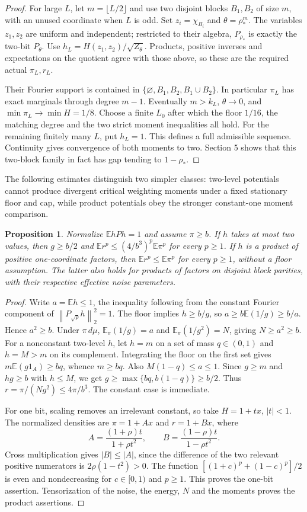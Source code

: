 \documentclass[11pt]{article}
\newcommand{\E}{\mathbb E}
\newcommand{\norm}[1]{\left\|#1\right\|}
\newtheorem{proposition}[theorem]{Proposition}
\begin{document}
\begin{proof}
For large $L$, let $m=\lfloor L/2\rfloor$ and use two disjoint blocks $B_1,B_2$ of size $m$, with an unused coordinate when $L$ is odd. Set $z_i=\chi_{B_i}$ and $\theta=\rho_*^m$. The variables $z_1,z_2$ are uniform and independent; restricted to their algebra, $P_{\rho_*}$ is exactly the two-bit $P_\theta$. Use $h_L=H(z_1,z_2)/\sqrt{Z_\theta}$. Products, positive inverses and expectations on the quotient agree with those above, so these are the required actual $\pi_L,r_L$.

Their Fourier support is contained in
$\{\varnothing,B_1,B_2,B_1\cup B_2\}$. In particular $\pi_L$ has exact marginals through degree $m-1$. Eventually $m>k_L$, $\theta\to0$, and $\min\pi_L\to\min H=1/8$. Choose a finite $L_0$ after which the floor $1/16$, the matching degree and the two strict moment inequalities all hold. For the remaining finitely many $L$, put $h_L=1$. This defines a full admissible sequence. Continuity gives convergence of both moments to two. Section 5 shows that this two-block family in fact has gap tending to $1-\rho_*$.
\end{proof}

The following estimates distinguish two simpler classes: two-level potentials cannot produce divergent critical weighting moments under a fixed stationary floor and cap, while product potentials obey the stronger constant-one moment comparison.
\begin{proposition}\label{simplefamilies}
Normalize $\E hPh=1$ and assume $\pi\geq b$. If $h$ takes at most two values, then $g\geq b/2$ and
$\E r^p\leq(4/b^3)^p\E\pi^p$ for every $p\geq1$.
If $h$ is a product of positive one-coordinate factors, then $\E r^p\leq\E\pi^p$ for every $p\geq1$, without a floor assumption. The latter also holds for products of factors on disjoint block parities, with their respective effective noise parameters.
\end{proposition}
\begin{proof}
Write $a=\E h\leq1$, the inequality following from the constant Fourier component of $\norm{P_{\sqrt\rho}h}_2^2=1$. The floor implies $h\geq b/g$, so $a\geq b\E(1/g)\geq b/a$. Hence $a^2\geq b$. Under $\pi\,d\mu$,
$\E_\pi(1/g)=a$ and $\E_\pi(1/g^2)=N$, giving $N\geq a^2\geq b$.
For a nonconstant two-level $h$, let $h=m$ on a set of mass $q\in(0,1)$ and $h=M>m$ on its complement. Integrating the floor on the first set gives $m\E(g1_A)\geq bq$, whence $m\geq bq$. Also $M(1-q)\leq a\leq1$. Since $g\geq m$ and $hg\geq b$ with $h\leq M$, we get $g\geq\max\{bq,b(1-q)\}\geq b/2$. Thus $r=\pi/(Ng^2)\leq4\pi/b^3$. The constant case is immediate.

For one bit, scaling removes an irrelevant constant, so take $H=1+tx$, $|t|<1$. The normalized densities are $\pi=1+Ax$ and $r=1+Bx$, where
\[
 A=\frac{(1+\rho)t}{1+\rho t^2},\qquad
 B=\frac{(1-\rho)t}{1-\rho t^2}.
\]
Cross multiplication gives $|B|\leq|A|$, since the difference of the two relevant positive numerators is $2\rho(1-t^2)>0$. The function
$[(1+c)^p+(1-c)^p]/2$ is even and nondecreasing for $c\in[0,1)$ and $p\geq1$. This proves the one-bit assertion. Tensorization of the noise, the energy, $N$ and the moments proves the product assertions.
\end{proof}
\end{document}
